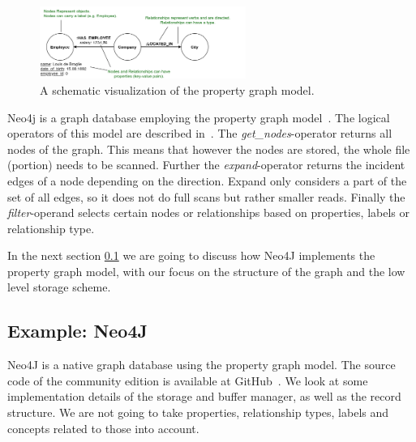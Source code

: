         \begin{figure}
            \begin{center}
                \includegraphics[keepaspectratio,width=0.6\textwidth]{img/03-preliminaries/property_graph_elements.png}
            \end{center}
            \caption{A schematic visualization of the property graph model.} 
            \label{propertygraph}
        \end{figure}

        
        Neo4j is a graph database employing the property graph model~\cite{robinson2015graph}.
        The logical operators of this model are described in~\autocite{Holsch2016Algeb}. 
        The \textit{get\_nodes}-operator returns all nodes of the graph.
        This means that however the nodes are stored, the whole file (portion) needs to be scanned.
        Further the \textit{expand}-operator returns the incident edges of a node depending on the direction.
        Expand only considers a part of the set of all edges, so it does not do full scans but rather smaller reads.
        Finally the \textit{filter}-operand selects certain nodes or relationships based on properties, labels or relationship type.
        
        In the next section \ref{n4j} we are going to discuss how Neo4J implements the property graph model, with our focus on the structure of the graph and the low level storage scheme.

    \subsection{Example: Neo4J}\label{n4j}
        Neo4J is a native graph database using the property graph model.
        The source code of the community edition is available at GitHub~\autocite{GitHubneo4j}.
        We look at some implementation details of the storage and buffer manager, as well as the record structure.
        We are not going to take properties, relationship types, labels and concepts related to those into account.
        
